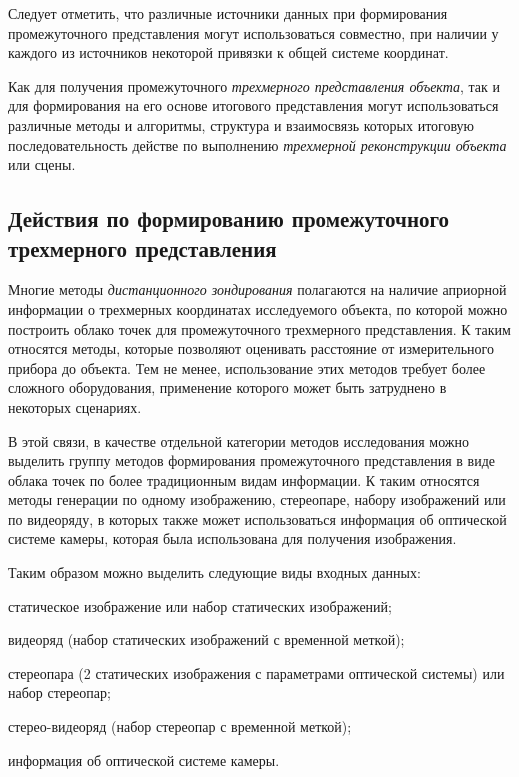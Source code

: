 Следует отметить, что различные источники данных при формирования промежуточного представления могут использоваться совместно, при наличии у каждого из источников некоторой привязки к общей системе координат.

Как для получения промежуточного \textit{трехмерного представления объекта}, так и для формирования на его основе итогового представления могут использоваться различные методы и алгоритмы, структура и взаимосвязь которых итоговую последовательность действе по выполнению \textit{трехмерной реконструкции объекта} или сцены.


\subsection{Действия по формированию промежуточного трехмерного представления}

Многие методы \textit{дистанционного зондирования} полагаются на наличие априорной информации о трехмерных координатах исследуемого объекта, по которой можно построить облако точек для промежуточного трехмерного представления. К таким относятся методы, которые позволяют оценивать расстояние от измерительного прибора до объекта. Тем не менее, использование этих методов требует более сложного оборудования, применение которого может быть затруднено в некоторых сценариях.

В этой связи, в качестве отдельной категории методов исследования можно выделить группу методов формирования промежуточного представления в виде облака точек по более традиционным видам информации. К таким относятся методы генерации по одному изображению, стереопаре, набору изображений или по видеоряду, в которых также может использоваться информация об оптической системе камеры, которая была использована для получения изображения.

Таким образом можно выделить следующие виды входных данных:
\begin{textitemize}
    \item статическое изображение или набор статических изображений;
    \item видеоряд (набор статических изображений с временной меткой);
    \item стереопара (2 статических изображения с параметрами оптической системы) или набор стереопар;
    \item стерео-видеоряд (набор стереопар с временной меткой);
    \item информация об оптической системе камеры.
\end{textitemize}

